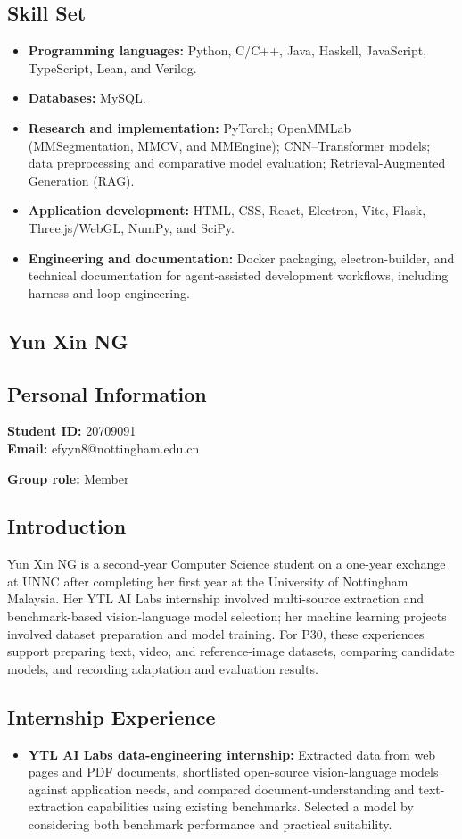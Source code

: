 \documentclass[a4paper,12pt]{article}
\newcommand{\PersonalInformation}[2]{%
  \subsection*{Personal Information}
  \if\relax\detokenize{#1}\relax\else
  \noindent\textbf{Student ID:} #1\\
  \fi
  \textbf{Email:} #2\par
}
\begin{document}
\subsection*{Skill Set}
\begin{itemize}
  \item \textbf{Programming languages:} Python, C/C++, Java, Haskell, JavaScript, TypeScript, Lean, and Verilog.
  \item \textbf{Databases:} MySQL.
  \item \textbf{Research and implementation:} PyTorch; OpenMMLab (MMSegmentation, MMCV, and MMEngine); CNN--Transformer models; data preprocessing and comparative model evaluation; Retrieval-Augmented Generation (RAG).
  \item \textbf{Application development:} HTML, CSS, React, Electron, Vite, Flask, Three.js/WebGL, NumPy, and SciPy.
  \item \textbf{Engineering and documentation:} Docker packaging, electron-builder, and technical documentation for agent-assisted development workflows, including harness and loop engineering.
\end{itemize}

\subsection{Yun Xin NG}
\PersonalInformation{20709091}{efyyn8@nottingham.edu.cn}
\noindent\textbf{Group role:} Member\par

\subsection*{Introduction}
Yun Xin NG is a second-year Computer Science student on a one-year exchange at UNNC after completing her first year at the University of Nottingham Malaysia. Her YTL AI Labs internship involved multi-source extraction and benchmark-based vision-language model selection; her machine learning projects involved dataset preparation and model training. For P30, these experiences support preparing text, video, and reference-image datasets, comparing candidate models, and recording adaptation and evaluation results.

\subsection*{Internship Experience}
\begin{itemize}
  \item \textbf{YTL AI Labs data-engineering internship:} Extracted data from web pages and PDF documents, shortlisted open-source vision-language models against application needs, and compared document-understanding and text-extraction capabilities using existing benchmarks. Selected a model by considering both benchmark performance and practical suitability.
\end{itemize}
\end{document}
